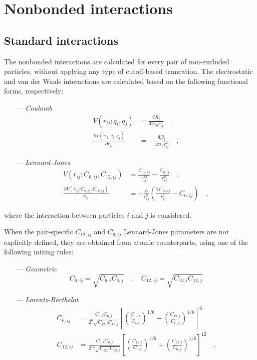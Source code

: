 \documentclass[10pt,a4paper,openany]{memoir}
\numberwithin{equation}{section}
\begin{document}
\section{Nonbonded interactions}
\label{sec:nonbonded}

\subsection{Standard interactions}
\label{sec:standard-lj-interactions}

The nonbonded interactions are calculated for every pair of
non-excluded particles, without applying any type of cutoff-based
truncation.  The electrostatic and van der Waals interactions are
calculated based on the following functional forms, respectively:\cite{GROMOS-doc,GROMACS-doc}

\begin{itemize}
\item[---] \textit{Coulomb}
  \begin{align}
  \label{eq:coulomb-term}
    V(r_{ij};q_i,q_j) & = \frac{q_i q_j}{4\pi\epsilon_0 r_{ij}} \quad , \\ \nonumber
    \frac{\partial V(r_{ij};q_i,q_j)}{\partial r_{ij}} & = -\frac{q_i q_j}{4 \pi \epsilon_0 r_{ij}^2} \quad ,
\end{align}
\item[---] \textit{Lennard-Jones}
    \begin{align}
  \label{eq:lj-term}
      V(r_{ij};C_{6,ij},C_{12,ij}) & = \frac{C_{12,ij}}{r_{ij}^{12}} - \frac{C_{6,ij}}{r_{ij}^6} \quad , \\ \nonumber
      \frac{\partial V(r_{ij};C_{6,ij},C_{12,ij})}{r_{ij}} & = -\frac{6}{r_{ij}^8}\left(\frac{2C_{12,ij}}{r_{ij}^{6}} - C_{6,ij} \right) \quad ,
\end{align}
\end{itemize}
where the interaction between particles $i$ and $j$ is considered.

When the pair-specific $C_{12,ij}$ and
$C_{6,ij}$ Lennard-Jones parameters are not explicitly defined,
they are obtained from atomic
counterparts, using one of the following mixing rules:
\begin{itemize}
\item [---] \textit{Geometric}
  \begin{equation}
    \label{eq:geometric-mix}
    C_{6,ij} = \sqrt{C_{6,i}C_{6,j}} \quad , \quad C_{12,ij} = \sqrt{C_{12,i}C_{12,j}}
  \end{equation}
\item [---]\textit{Lorentz-Berthelot}
  \begin{align}
    \label{eq:lorentz-mix}
    C_{6,ij} &= \frac{C_{6,i}C_{6,j}}{2^6 \sqrt{C_{12,i}C_{12,j}}}\left[\left(\frac{C_{12,i}}{C_{6,i}}\right)^{1/6} + \left(\frac{C_{12,j}}{C_{6,j}}\right)^{1/6} \right]^6  \\ \nonumber
    C_{12,ij} &= \frac{C_{6,i}C_{6,j}}{2^{12} \sqrt{C_{12,i}C_{12,j}}}\left[\left(\frac{C_{12,i}}{C_{6,i}}\right)^{1/6} + \left(\frac{C_{12,j}}{C_{6,j}}\right)^{1/6} \right]^{12} \quad .
  \end{align}
\end{itemize}
\end{document}
